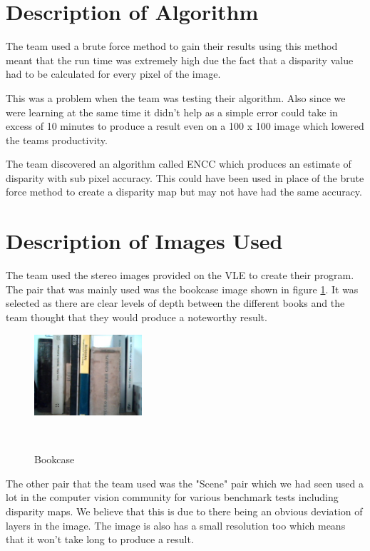 \documentclass[twocolumn]{article}
\begin{document}
\section{Description of Algorithm}
\vspace{-1ex}

The team used a brute force method to gain their results using this method meant that the run time was extremely high due the fact that a disparity value had to be calculated for every pixel of the image. 

This was a problem when the team was testing their algorithm. Also since we were learning at the same time it didn't help as a simple error could take in excess of 10 minutes to produce a result even on a 100 x 100 image which lowered the teams productivity. 



The team discovered an algorithm called ENCC \cite{ENCC} which produces an estimate of disparity with sub pixel accuracy. This could have been used in place of the brute force method to create a disparity map but may not have had the same accuracy. 

\section{Description of Images Used}
\vspace{-1ex}

The team used the stereo images provided on the VLE to create their program. The pair that was mainly used was the bookcase image shown in figure \ref{fig:testR}. It was selected as there are clear levels of depth between the different books and the team thought that they would produce a noteworthy result. 

\begin{figure}[H]
\centering
  \includegraphics[width=40mm]{Figures/testR}
    \caption{Bookcase}~\label{fig:testR}
\end{figure} 

The other pair that the team used was the "Scene" pair which we had seen used a lot in the computer vision community \cite{sceneusage} \cite{sceneusage2} for various benchmark tests including disparity maps. We believe that this is due to there being an obvious deviation of layers in the image. The image is also has a small resolution too which means that it won't take long to produce a result.  
\end{document}
